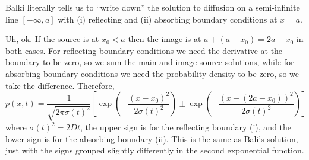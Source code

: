

Balki literally tells us to ``write down'' the solution to diffusion on a semi-infinite line $[-\infty, a]$ with (i) reflecting and (ii) absorbing boundary conditions at $x=a$.



Uh, ok.
If the source is at $x_0 < a$ then the image is at $a + (a - x_0) = 2a - x_0$ in both cases.
For reflecting boundary conditions we need the derivative at the boundary to be zero, so we sum the main and image source solutions, while for absorbing boundary conditions we need the probability density to be zero, so we take the difference.
Therefore,
\begin{equation*}
  p(x, t) = \frac{1}{\sqrt{2 \pi \sigma(t)^2}} \left[
    \exp \left( - \frac{(x - x_0)^2}{2 \sigma(t)^2} \right)
    \pm
    \exp \left( - \frac{(x - (2a - x_0))^2}{2 \sigma(t)^2} \right)
  \right]
\end{equation*}
where $\sigma(t)^2 = 2 D t$, the upper sign is for the reflecting boundary (i), and the lower sign is for the absorbing boundary (ii).
This is the same as Bali's solution, just with the signs grouped slightly differently in the second exponential function.
